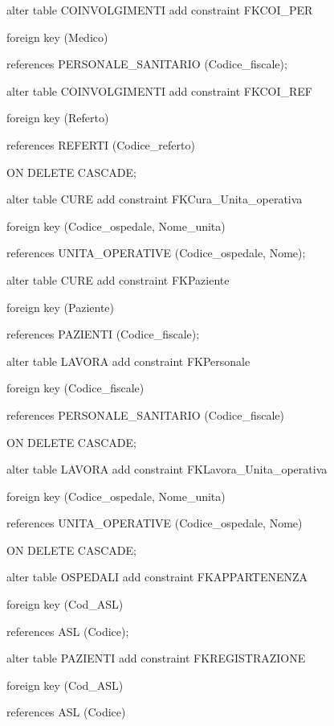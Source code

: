 \documentclass[a4paper,12pt]{report}
\begin{document}
\noindent alter table COINVOLGIMENTI add constraint FKCOI\_PER

     foreign key (Medico)

     references PERSONALE\_SANITARIO (Codice\_fiscale); \newline

\noindent alter table COINVOLGIMENTI add constraint FKCOI\_REF

     foreign key (Referto)

     references REFERTI (Codice\_referto)

     ON DELETE CASCADE; \newline

\noindent alter table CURE add constraint FKCura\_Unita\_operativa

     foreign key (Codice\_ospedale, Nome\_unita)

     references UNITA\_OPERATIVE (Codice\_ospedale, Nome); \newline

\noindent alter table CURE add constraint FKPaziente

     foreign key (Paziente)

     references PAZIENTI (Codice\_fiscale); \newline

\noindent alter table LAVORA add constraint FKPersonale

     foreign key (Codice\_fiscale)

     references PERSONALE\_SANITARIO (Codice\_fiscale)

     ON DELETE CASCADE; \newline

\noindent alter table LAVORA add constraint FKLavora\_Unita\_operativa

     foreign key (Codice\_ospedale, Nome\_unita)

     references UNITA\_OPERATIVE (Codice\_ospedale, Nome)

     ON DELETE CASCADE; \newline

\noindent alter table OSPEDALI add constraint FKAPPARTENENZA

     foreign key (Cod\_ASL)

     references ASL (Codice); \newline

\noindent alter table PAZIENTI add constraint FKREGISTRAZIONE

     foreign key (Cod\_ASL)

     references ASL (Codice)
\end{document}
